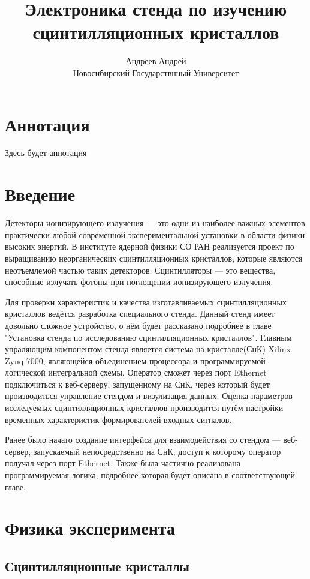 \documentclass[a4paper, 12pt]{article}
\title{Электроника стенда по изучению сцинтилляционных кристаллов}
\author{Андреев Андрей\\Новосибирский Государствнный Университет}
\begin{document}
\maketitle
\newpage

\section*{Аннотация}
Здесь будет аннотация
\newpage

\tableofcontents
\newpage

\section{Введение}
Детекторы ионизирующего излучения --- это одни из наиболее важных элементов практически любой современной экспериментальной установки в области физики высоких энергий. В институте ядерной физики СО РАН реализуется проект по выращиванию неорганических сцинтилляционных кристаллов, которые являются неотъемлемой частью таких детекторов. Сцинтилляторы --- это вещества, способные излучать фотоны при поглощении ионизирующего излучения.\par
Для проверки характеристик и качества изготавливаемых сцинтилляционных кристаллов ведётся разработка специального стенда. Данный стенд имеет довольно сложное устройство, о нём будет рассказано подробнее в главе "Установка стенда по исследованию сцинтилляционных кристаллов". Главным упраляющим компонентом стенда является система на кристалле(СнК) Xilinx Zynq-7000, являющейся объединением процессора и программируемой логической интегральной схемы. Оператор сможет через порт Ethernet подключиться к веб-серверу, запущенному на СнК, через который будет производиться управление стендом и визулизация данных. Оценка параметров исследуемых сцинтилляционных кристаллов производится путём настройки временных характеристик формирователей входных сигналов.\par
Ранее было начато создание интерфейса для взаимодействия со стендом --- веб-сервер, запускаемый непосредственно на СнК, доступ к которому оператор получал через порт Ethernet. Также была частично реализована программируемая логика, подробнее которая будет описана в соответствующей главе.\par

\section{Физика эксперимента}
    \subsection{Сцинтилляционные кристаллы}
    
\end{document}

